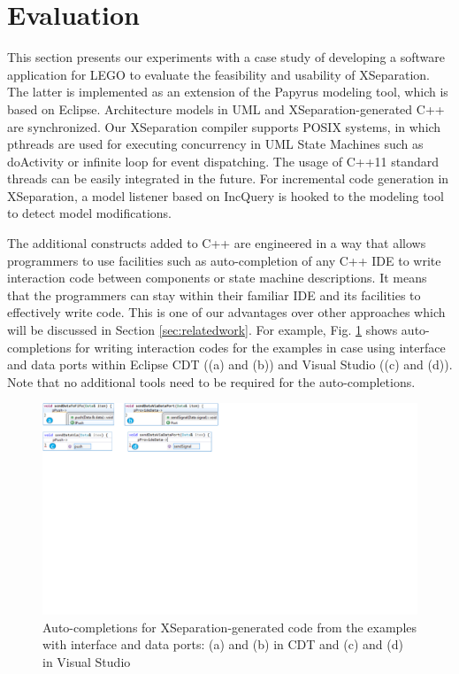 \section{Evaluation}
\label{sec:evaluation}
This section presents our experiments with a case study of developing a software application for LEGO to evaluate the feasibility and usability of XSeparation.
The latter is implemented as an extension of the Papyrus modeling tool, which is based on Eclipse.
Architecture models in UML and XSeparation-generated C++ are synchronized.
Our XSeparation compiler supports POSIX systems, in which pthreads are used for executing concurrency in UML State Machines such as doActivity or infinite loop for event dispatching.
The usage of C++11 standard threads can be easily integrated in the future.
For incremental code generation in XSeparation, a model listener based on IncQuery is hooked to the modeling tool to detect model modifications.

The additional constructs added to C++ are engineered in a way that allows programmers to use facilities such as auto-completion of any C++ IDE to write interaction code between components or state machine descriptions.
It means that the programmers can stay within their familiar IDE and its facilities to effectively write code.
This is one of our advantages over other approaches which will be discussed in Section \ref{sec:relatedwork}. 
For example, Fig. \ref{fig:autocompletion} shows auto-completions for writing interaction codes for the examples in case using interface and data ports within Eclipse CDT ((a) and (b)) and Visual Studio ((c) and (d)).
Note that no additional tools need to be required for the auto-completions.

\begin{figure}
	\centering
	\includegraphics[clip, trim=0cm 14.6cm 17.7cm 0cm, width=\columnwidth]{figures/autocompletion.pdf}
	\caption{Auto-completions for XSeparation-generated code from the examples with interface and data ports: (a) and (b) in CDT and (c) and (d) in Visual Studio} 
	\label{fig:autocompletion}
\end{figure}

